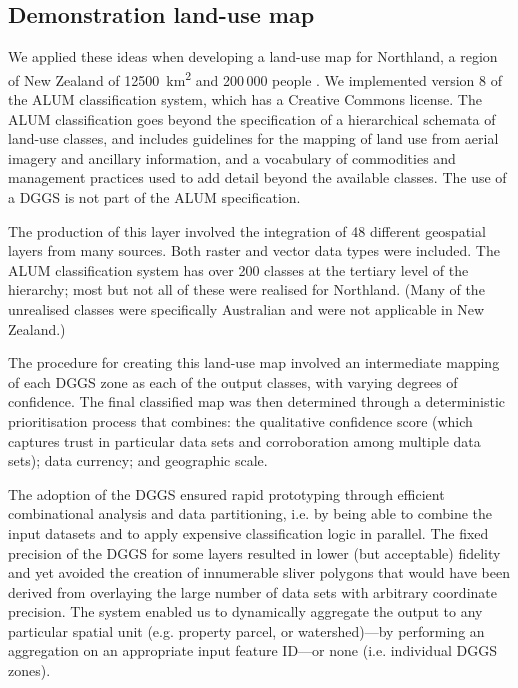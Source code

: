 \documentclass[]{interact}
\theoremstyle{plain}%
\theoremstyle{definition}
\theoremstyle{remark}
\begin{document}
\subsection{Demonstration land-use map}

We applied these ideas when developing a land-use map for Northland, a region of New Zealand of \qty{12500}{\km\squared} and 200\,000 people \citep[see][]{law2023}. We implemented version 8 of the \ac{ALUM} classification system, which has a Creative Commons license. The \ac{ALUM} classification goes beyond the specification of a hierarchical schemata of land-use classes, and includes guidelines for the mapping of land use from aerial imagery and ancillary information, and a vocabulary of commodities and management practices used to add detail beyond the available classes. The use of a \ac{DGGS} is not part of the \ac{ALUM} specification.

The production of this layer involved the integration of 48 different geospatial layers from many sources. Both raster and vector data types were included. The \ac{ALUM} classification system has over 200 classes at the tertiary level of the hierarchy; most but not all of these were realised for Northland. (Many of the unrealised classes were specifically Australian and were not applicable in New Zealand.)

The procedure for creating this land-use map involved an intermediate mapping of each \ac{DGGS} zone as each of the output classes, with varying degrees of confidence. The final classified map was then determined through a deterministic prioritisation process that combines: the qualitative confidence score (which captures trust in particular data sets and corroboration among multiple data sets); data currency; and geographic scale.

The adoption of the \ac{DGGS} ensured rapid prototyping through efficient combinational analysis and data partitioning, i.e. by being able to combine the input datasets and to apply expensive classification logic in parallel. The fixed precision of the \ac{DGGS} for some layers resulted in lower (but acceptable) fidelity and yet avoided the creation of innumerable sliver polygons that would have been derived from overlaying the large number of data sets with arbitrary coordinate precision. The system enabled us to dynamically aggregate the output to any particular spatial unit (e.g. property parcel, or watershed)---by performing an aggregation on an appropriate input feature ID---or none (i.e. individual \ac{DGGS} zones).
\end{document}
